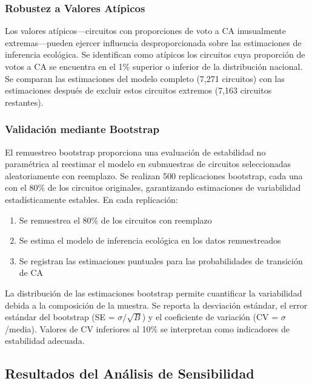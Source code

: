 \subsubsection{Robustez a Valores Atípicos}

Los valores atípicos---circuitos con proporciones de voto a CA inusualmente extremas---pueden ejercer influencia desproporcionada sobre las estimaciones de inferencia ecológica. Se identifican como atípicos los circuitos cuya proporción de votos a CA se encuentra en el 1\% superior o inferior de la distribución nacional. Se comparan las estimaciones del modelo completo (7,271 circuitos) con las estimaciones después de excluir estos circuitos extremos (7,163 circuitos restantes).

\subsubsection{Validación mediante Bootstrap}

El remuestreo bootstrap proporciona una evaluación de estabilidad no paramétrica al reestimar el modelo en submuestras de circuitos seleccionadas aleatoriamente con reemplazo. Se realizan 500 replicaciones bootstrap, cada una con el 80\% de los circuitos originales, garantizando estimaciones de variabilidad estadísticamente estables. En cada replicación:

\begin{enumerate}
    \item Se remuestrea el 80\% de los circuitos con reemplazo
    \item Se estima el modelo de inferencia ecológica en los datos remuestreados
    \item Se registran las estimaciones puntuales para las probabilidades de transición de CA
\end{enumerate}

La distribución de las estimaciones bootstrap permite cuantificar la variabilidad debida a la composición de la muestra. Se reporta la desviación estándar, el error estándar del bootstrap (SE = $\sigma/\sqrt{B}$) y el coeficiente de variación (CV = $\sigma$/media). Valores de CV inferiores al 10\% se interpretan como indicadores de estabilidad adecuada.

\subsection{Resultados del Análisis de Sensibilidad}
\label{sec:sensibilidad_resultados}

